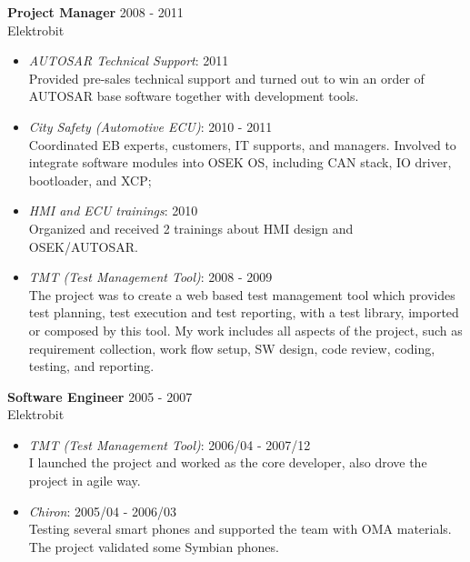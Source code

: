 \textbf{Project Manager} \hfill 2008 - 2011\\
        Elektrobit
        \begin{itemize}  \itemsep -2pt %
            \item {\em AUTOSAR Technical Support}: 2011 \\
                    Provided pre-sales technical support
                    and turned out to win an order of AUTOSAR base software together with development tools.
            \item {\em City Safety (Automotive ECU)}: 2010 - 2011 \\
                    Coordinated EB experts, customers, IT supports, and managers.
                    Involved to integrate software modules into OSEK OS,
                    including CAN stack, IO driver, bootloader, and XCP;
            \item {\em HMI and ECU trainings}: 2010\\
                Organized and received 2 trainings about HMI design and OSEK/AUTOSAR.
            \item {\em TMT (Test Management Tool)}: 2008 - 2009 \\
                    The project was to create a web based test management tool
                    which provides test planning, test execution and test reporting,
                    with a test library, imported or composed by this tool.
                    My work includes all aspects of the project,
                    such as requirement collection, work flow setup, SW design, code review, coding, testing, and reporting.
        \end{itemize}
 
\textbf{Software Engineer} \hfill 2005 - 2007 \\
        Elektrobit
        \begin{itemize}  \itemsep -2pt %
            \item {\em TMT (Test Management Tool)}: 2006/04 - 2007/12 \\ 
            I launched the project and worked as the core developer, also drove
            the project in agile way.
            \item {\em Chiron}: 2005/04 - 2006/03 \\
                Testing several smart phones and supported the team with OMA materials.
                The project validated some Symbian phones.
        \end{itemize}
 
